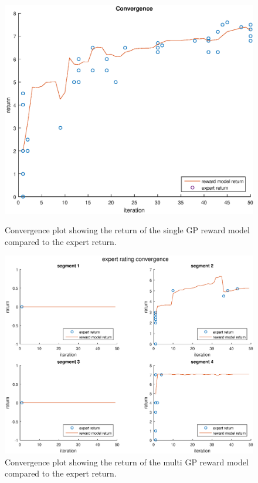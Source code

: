 \documentclass[mscThesis.tex]{subfiles}
\begin{document}
\begin{figure}[!htb]
    \centering
    \begin{minipage}{.5\textwidth}
        \centering
        \includegraphics[width=\textwidth, keepaspectratio=1]{figures/results/advancedx/convergence_single_manual.eps}
        \caption{Convergence plot showing the return of the single GP reward model compared to the expert return.}
        \label{fig:adx-single-manual-con}
    \end{minipage}%
    \begin{minipage}{0.5\textwidth}
        \centering
        \includegraphics[width=\textwidth, keepaspectratio=1]{figures/results/advancedx/convergence_multi_manual.eps}
        \caption{Convergence plot showing the return of the multi GP reward model compared to the expert return.}
        \label{fig:adx-multi-manual-con}
    \end{minipage}
\end{figure}
\end{document}

